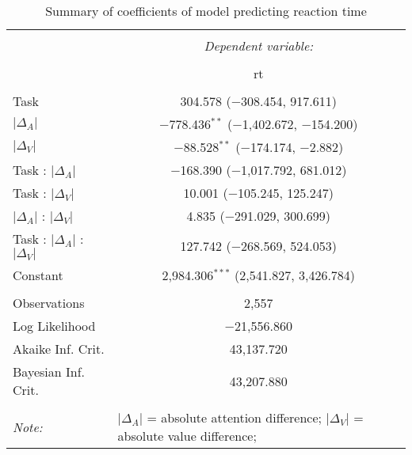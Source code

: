 
\begin{table}[t] \centering 
  \caption{Summary of coefficients of model predicting reaction time} 
  \label{table:rtModel} 
\begin{tabular}{@{\extracolsep{5pt}}lc} 
\\[-1.8ex]\hline 
\hline \\[-1.8ex] 
 & \multicolumn{1}{c}{\textit{Dependent variable:}} \\ 
\cline{2-2} 
\\[-1.8ex] & rt \\ 
\hline \\[-1.8ex] 
 Task & 304.578 ($-$308.454, 917.611) \\ 
  $\vert\Delta_A\vert$ & $-$778.436$^{**}$ ($-$1,402.672, $-$154.200) \\ 
  $\vert\Delta_V\vert$ & $-$88.528$^{**}$ ($-$174.174, $-$2.882) \\ 
  Task : $\vert\Delta_A\vert$ & $-$168.390 ($-$1,017.792, 681.012) \\ 
  Task : $\vert\Delta_V\vert$ & 10.001 ($-$105.245, 125.247) \\ 
  $\vert\Delta_A\vert$ : $\vert\Delta_V\vert$ & 4.835 ($-$291.029, 300.699) \\ 
  Task : $\vert\Delta_A\vert$ :  $\vert\Delta_V\vert$ & 127.742 ($-$268.569, 524.053) \\ 
  Constant & 2,984.306$^{***}$ (2,541.827, 3,426.784) \\ 
 \hline \\[-1.8ex] 
Observations & 2,557 \\ 
Log Likelihood & $-$21,556.860 \\ 
Akaike Inf. Crit. & 43,137.720 \\ 
Bayesian Inf. Crit. & 43,207.880 \\ 
\hline 
\hline \\[-1.8ex] 
\textit{Note:}  & \multicolumn{1}{l}{\footnotesize $\vert\Delta_A\vert$ = absolute attention difference; $\vert\Delta_V\vert$ = absolute value difference; } \\ 
\end{tabular} 
\end{table} 
